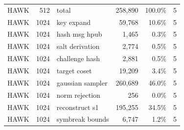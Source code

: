 \begin{table}[t]
{\begin{tabular}{lrlrrr}
HAWK & 512 & total & 258{,}890 & 100.0\% & 5 \\
HAWK & 1024 & key expand & 59{,}768 & 10.6\% & 5 \\
HAWK & 1024 & hash msg hpub & 1{,}465 & 0.3\% & 5 \\
HAWK & 1024 & salt derivation & 2{,}774 & 0.5\% & 5 \\
HAWK & 1024 & challenge hash & 2{,}881 & 0.5\% & 5 \\
HAWK & 1024 & target coset & 19{,}209 & 3.4\% & 5 \\
HAWK & 1024 & gaussian sampler & 260{,}689 & 46.0\% & 5 \\
HAWK & 1024 & norm rejection & 256 & 0.0\% & 5 \\
HAWK & 1024 & reconstruct s1 & 195{,}255 & 34.5\% & 5 \\
HAWK & 1024 & symbreak bounds & 6{,}747 & 1.2\% & 5 \\
\bottomrule
\end{tabular}}
\end{table}

